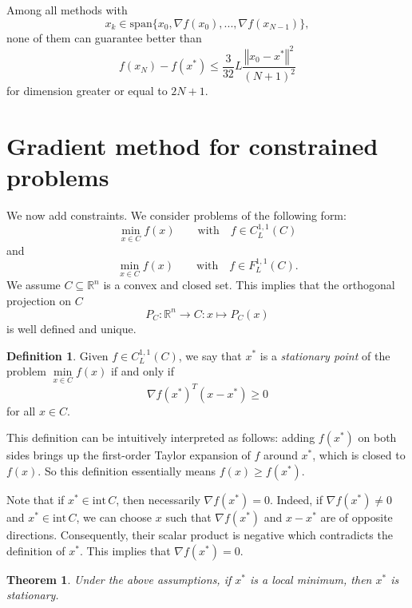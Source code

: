 \documentclass{article}
\newtheorem{theorem}{Theorem}
\theoremstyle{definition}
\newtheorem{defi}{Definition}
\newcommand{\myspan}{\mathrm{span}} %
\newcommand{\myint}{\mathrm{int}} %
\newcommand{\vnorm}[1]{\left\Vert #1 \right\Vert}
\begin{document}
Among all methods with
\begin{equation*}
x_k \in \myspan\{x_0, \nabla f(x_0), ..., \nabla f(x_{N-1})\},
\end{equation*}
none of them can guarantee better than
\begin{equation*}
f(x_N) - f(x^*) \le \frac{3}{32}L \frac{{\vnorm{x_0-x^*}}^2}{(N+1)^2}
\end{equation*}
for dimension greater or equal to $2N+1$.

\section{Gradient method for constrained problems}

We now add constraints. We consider problems of the following form:
\begin{equation*}
\min_{x \in C} f(x) \qquad \text{with} \quad f \in C_L^{1,1}(C)
\end{equation*}
and
\begin{equation*}
\min_{x \in C} f(x) \qquad \text{with} \quad f \in F_L^{1,1}(C) .
\end{equation*}
We assume $C \subseteq \mathbb{R}^n$ is a convex and closed set. This implies that the orthogonal projection on $C$
\begin{equation*}
P_C : \mathbb{R}^n \to C : x \mapsto P_C(x)
\end{equation*}
is well defined and unique.

\begin{defi}
Given $f \in C_L^{1,1}(C)$, we say that $x^*$ is a \emph{stationary point} of the problem $\min\limits_{x \in C} f(x)$ if and only if
\begin{equation*}
\nabla f(x^*)^T(x-x^*) \ge 0
\end{equation*}
for all $x \in C$.
\end{defi}
This definition can be intuitively interpreted as follows: adding $f(x^*)$ on both sides brings up the first-order Taylor expansion of $f$ around $x^*$, which is closed to $f(x)$. So this definition essentially means $f(x) \ge f(x^*)$.

Note that if $x^* \in \myint\, C$, then necessarily $\nabla f(x^*) = 0$.
Indeed, if $\nabla f(x^*) \neq 0$ and $x^* \in \myint\, C$, we can choose $x$ such that $\nabla f(x^*)$ and $x-x^*$ are of opposite directions. Consequently, their scalar product is negative which contradicts the definition of $x^*$. This implies that $\nabla f(x^*) = 0$.

\begin{theorem}
Under the above assumptions, if $x^*$ is a local minimum, then $x^*$ is stationary.
\end{theorem}
\end{document}
